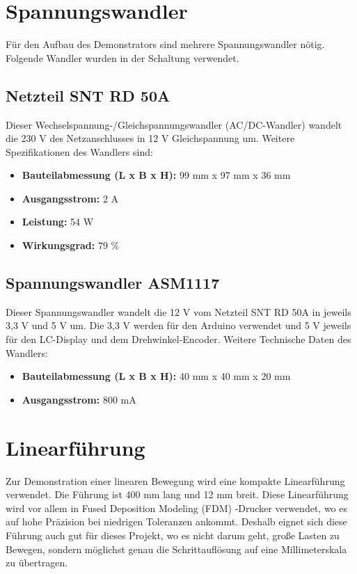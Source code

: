 \section{Spannungswandler}
Für den Aufbau des Demonstrators sind mehrere Spannungswandler nötig. Folgende Wandler wurden in der Schaltung verwendet.
\subsection{Netzteil SNT RD 50A}
Dieser Wechselspannung-/Gleichspannungswandler (AC/DC-Wandler) wandelt die 230 V des Netzanschlusses in 12 V Gleichspannung um. %
Weitere Spezifikationen des Wandlers sind:
\begin{itemize}
	\item \textbf{Bauteilabmessung (L x B x H):} 99 mm x 97 mm x 36 mm
	\item \textbf{Ausgangsstrom:} 2 A
	\item \textbf{Leistung:} 54 W
	\item \textbf{Wirkungsgrad:} 79 \% 
\end{itemize} 
\cite{Meanwell.2019}

\subsection{Spannungswandler ASM1117}
Dieser Spannungswandler wandelt die 12 V vom Netzteil SNT RD 50A in jeweils 3,3 V und 5 V um. Die 3,3 V werden für den Arduino verwendet und 5 V jeweils für den LC-Display und dem Drehwinkel-Encoder. Weitere Technische Daten des Wandlers:
\begin{itemize}
	\item \textbf{Bauteilabmessung (L x B x H):} 40 mm x 40 mm x 20 mm 
	\item \textbf{Ausgangsstrom:} 800 mA
\end{itemize}
	\cite{AMS}
	
\section{Linearführung}
Zur Demonstration einer linearen Bewegung wird eine kompakte Linearführung verwendet. Die Führung ist 400 mm lang und 12 mm breit. Diese Linearführung wird vor allem in Fused Deposition Modeling (FDM) -Drucker verwendet, wo es auf hohe Präzision bei niedrigen Toleranzen ankommt. Deshalb eignet sich diese Führung auch gut für dieses Projekt, wo es nicht darum geht, große Lasten zu Bewegen, sondern möglichst genau die Schrittauflösung auf eine Millimeterskala zu übertragen.

